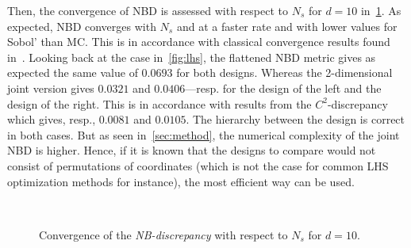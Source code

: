 \documentclass[1p]{elsarticle}
\begin{document}
\cleardoublepage

Then, the convergence of NBD is assessed with respect to $N_s$ for $d=10$ in~\cref{fig:metric}. As expected, NBD converges with $N_s$ and at a faster rate and with lower values for Sobol' than MC. This is in accordance with classical convergence results found in~\citep{Kucherenko2015}. Looking back at the case in~\cref{fig:lhs}, the flattened NBD metric gives as expected the same value of $0.0693$ for both designs. Whereas the 2-dimensional joint version gives $0.0321$ and $0.0406$---resp. for the design of the left and the design of the right. This is in accordance with results from the $C^2$-discrepancy which gives, resp., $0.0081$ and $0.0105$. The hierarchy between the design is correct in both cases. But as seen in~\cref{sec:method}, the numerical complexity of the joint NBD is higher. Hence, if it is known that the designs to compare would not consist of permutations of coordinates (which is not the case for common LHS optimization methods for instance), the most efficient way can be used.

\begin{figure}[!h]               
\centering
{}
~

\caption{Convergence of the \emph{NB-discrepancy} with respect to $N_s$ for $d=10$.}
\label{fig:metric}
\end{figure}
\end{document}
